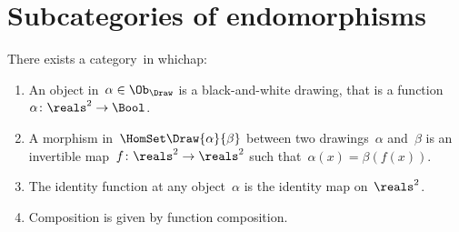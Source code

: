 
\section{Subcategories of endomorphisms}
\label{sec:Draw}


\index{\Draw}
\begin{definition}[Drawings]
	\label{def:Draw}
	There exists a category~\Draw in whichap:
	\begin{enumerate}
		\item An object in~$\alpha\in \Ob_\Draw$ is a black-and-white drawing,
		      that is a function~$\alpha \colon \reals^2 \to \Bool$.
		\item A morphism in~$\HomSet\Draw{\alpha}{\beta}$ between two drawings~$\alpha$ and~$\beta$ is an invertible map~$f\colon \reals^2 \to \reals^2$ such that~$\alpha(x) = \beta(f(x))$.
		\item The identity function at any object~$\alpha$ is the identity map on~$\reals^2$.
		\item Composition is given by function composition.
	\end{enumerate}
\end{definition}

